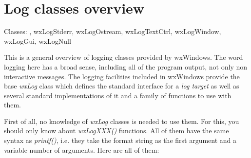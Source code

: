 \section{Log classes overview}\label{wxlogoverview}

Classes: , wxLogStderr,
wxLogOstream, wxLogTextCtrl, wxLogWindow, wxLogGui, wxLogNull

This is a general overview of logging classes provided by wxWindows. The word
logging here has a broad sense, including all of the program output, not only
non interactive messages. The logging facilities included in wxWindows provide
the base {\it wxLog} class which defines the standard interface for a {\it log
target} as well as several standard implementations of it and a family of
functions to use with them.

First of all, no knowledge of {\it wxLog} classes is needed to use them. For
this, you should only know about {\it wxLogXXX()} functions. All of them have
the same syntax as {\it printf()}, i.e. they take the format string as the
first argument and a variable number of arguments. Here are all of them:

